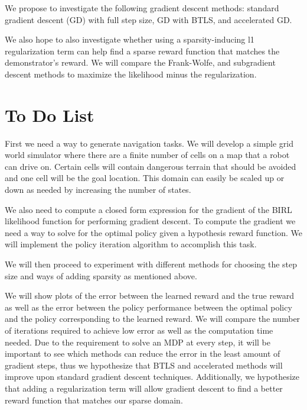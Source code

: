 \documentclass[10pt,a4paper]{article}
\begin{document}
We propose to investigate the following gradient descent methods: standard gradient descent (GD) with full step size, GD with BTLS, and accelerated GD.

We also hope to also investigate whether using a sparsity-inducing l1 regularization term can help find a sparse reward function that matches the demonstrator's reward. We will compare the Frank-Wolfe, and subgradient descent methods to maximize the likelihood minus the regularization. 




\section{To Do List}
First we need a way to generate navigation tasks. We will develop a simple grid world simulator where there are a finite number of cells on a map that a robot can drive on. Certain cells will contain dangerous terrain that should be avoided and one cell will be the goal location. This domain can easily be scaled up or down as needed by increasing the number of states.

We also need to compute a closed form expression for the gradient of the BIRL likelihood function for performing gradient descent. To compute the gradient we need a way to solve for the optimal policy given a hypothesis reward function. We will implement the policy iteration algorithm to accomplish this task. 

We will then proceed to experiment with different methods for choosing the step size and ways of adding sparsity as mentioned above. 

We will show plots of the error between the learned reward and the true reward as well as the error between the policy performance between the optimal policy and the policy corresponding to the learned reward. We will compare the number of iterations required to achieve low error as well as the computation time needed. Due to the requirement to solve an MDP at every step, it will be important to see which methods can reduce the error in the least amount of gradient steps, thus we hypothesize that BTLS and accelerated methods will improve upon standard gradient descent techniques. Additionally, we hypothesize that adding a regularization term will allow gradient descent to find a better reward function that matches our sparse domain.



\end{document}
